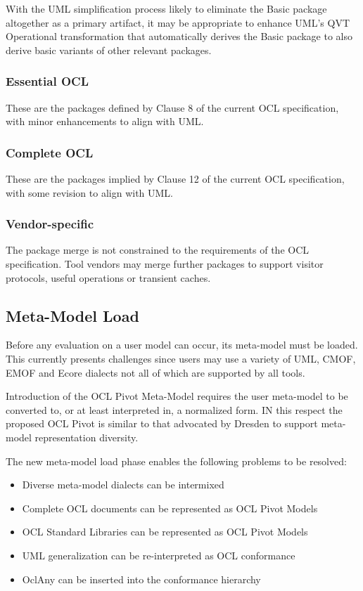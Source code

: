 \documentclass{eceasst}
\begin{document}
With the UML simplification process\cite{UML-simple} likely to eliminate the Basic package altogether as a primary artifact, it may be appropriate to enhance UML's QVT Operational transformation that automatically derives the Basic package to also derive basic variants of other relevant packages.

\subsubsection{Essential OCL}

These are the packages defined by Clause 8 of the current OCL specification, with minor enhancements to align with UML. 

\subsubsection{Complete OCL}

These are the packages implied by Clause 12 of the current OCL specification, with some revision to align with UML. 

\subsubsection{Vendor-specific}

The package merge is not constrained to the requirements of the OCL specification. Tool vendors may merge further packages to support visitor protocols, useful operations or transient caches.

\subsection{Meta-Model Load}

Before any evaluation on a user model can occur, its meta-model must be loaded. This currently presents challenges since users may use a variety of UML, CMOF, EMOF and Ecore dialects not all of which are supported by all tools.

Introduction of the OCL Pivot Meta-Model requires the user meta-model to be converted to, or at least interpreted in, a normalized form. IN this respect the proposed OCL Pivot is similar to that advocated by Dresden\cite{Dresden-Pivot} to support meta-model representation diversity.

The new meta-model load phase enables the following problems to be resolved:

\begin{itemize}
\item Diverse meta-model dialects can be intermixed
\item Complete OCL documents can be represented as OCL Pivot Models
\item OCL Standard Libraries can be represented as OCL Pivot Models
\item UML generalization can be re-interpreted as OCL conformance
\item OclAny can be inserted into the conformance hierarchy
\end{itemize}
\end{document}
